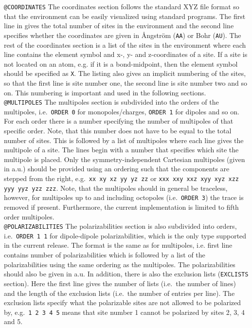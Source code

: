 \noindent\texttt{@COORDINATES}\newline
The coordinates section follows the standard XYZ file format so that the 
environment can be easily visualized using standard programs. The first line in 
gives the total number of sites in the environment and the second line 
specifies whether the coordinates are given in \AA{}ngstr\"{o}m (\verb|AA|) or 
Bohr (\verb|AU|). The rest of the coordinates section is a list of the sites in 
the environment where each line contains the element symbol and x-, y- and 
z-coordinates of a site. If a site is not located on an atom, e.g. if it is a 
bond-midpoint, then the element symbol should be specified as \verb|X|. The 
listing also gives an implicit numbering of the sites, so that the first line 
is site number one, the second line is site number two and so on. This 
numbering is important and used in the following sections.\\

\noindent\texttt{@MULTIPOLES}\newline
The multipoles section is subdivided into the orders of the multipoles, i.e.\ 
\verb|ORDER 0| for monopoles/charges, \verb|ORDER 1| for dipoles and so on. 
For each order there is a number specifying the number of multipoles of that 
specific order. Note, that this number does not have to be equal to the total 
number of sites. This is followed by a list of multipoles where each line 
gives the multipole of a site. The lines begin with a number that specifies 
which site the multipole is placed. Only the symmetry-independent Cartesian 
multipoles (given in a.u.) should be provided using an ordering such that the components are stepped from the right, e.g.\ \verb|xx xy xz yy yz zz| or 
\verb|xxx xxy xxz xyy xyz xzz yyy yyz yzz zzz|. Note, that the multipoles
should in general be traceless, however, for multipoles up to and including
octopoles (i.e.\ \verb|ORDER 3|) the trace is removed if present. Furthermore,
the current implementation is limited to fifth order multipoles.\\

\noindent\texttt{@POLARIZABILITIES}\newline
The polarizabilities section is also subdivided into orders,
i.e.\ \verb|ORDER 1 1| for dipole-dipole polarizabilities, which is the only 
type supported in the current release. The format is the same as for 
multipoles, i.e. first line contains number of polarizabilities which is 
followed by a list of the polarizabilities using the same ordering as the 
multipoles. The polarizabilities should also be given in a.u. In addition, 
there is also the exclusion lists (\verb|EXCLISTS| 
section). Here the first line gives the number of lists (i.e.\ the number of 
lines) and the length of the exclusion lists (i.e.\ the number of entries per 
line). The exclusion lists specify what the polarizable sites are not allowed 
to be polarized by, e.g.\ \verb|1 2 3 4 5| means that site number 1 cannot be 
polarized by sites 2, 3, 4 and 5.

